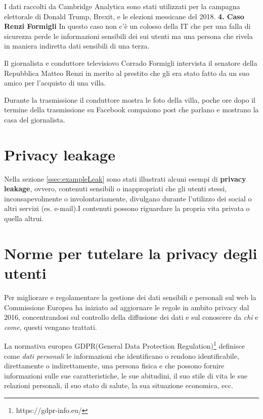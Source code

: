 I dati raccolti da Cambridge Analytica sono stati utilizzati per la campagna elettorale di Donald Trump, Brexit, e le elezioni messicane del 2018.\newline
\textbf{4. Caso Renzi Formigli}\cite{formigli}\newline
In questo caso non c'è un colosso della IT che per una falla di sicurezza perde le informazioni sensibili dei sui utenti ma una persona che rivela in maniera indiretta dati sensibili di una terza.

Il giornalista e conduttore televisiovo Corrado Formigli intervista il senatore della Repubblica Matteo Renzi in merito al prestito che gli era stato fatto da un suo amico per l’acquisto di una villa.


Durante la trasmissione il conduttore mostra le foto della villa, poche ore dopo il termine della trasmissione su Facebook compaiono post che parlano e mostrano la casa del giornalista.

\section{Privacy leakage}
\label{sec:privacyLeakage}
Nella sezione \ref{ssec:exampleLeak} sono stati illustrati alcuni esempi di \textbf{privacy leakage}, ovvero, contenuti sensibili o inappropriati che gli utenti stessi, inconsapevolmente o involontariamente, divulgano durante l'utilizzo dei social o altri servizi (es. e-mail).I contenuti possono riguardare la propria vita privata o quella altrui.

\section{Norme per tutelare la privacy degli utenti}
Per migliorare e regolamentare la gestione dei dati sensibili e personali sul web la Commissione Europea ha iniziato ad aggiornare le regole in ambito privacy dal 2016, concentrandosi sul controllo della diffusione dei dati e sul conoscere da \textit{chi} e \textit{come}, questi vengano trattati.

La normativa europea GDPR(General Data Protection Regulation)\footnote{https://gdpr-info.eu/} definisce come \textit{dati personali} le informazioni che identificano o rendono identificabile, direttamente o indirettamente, una persona fisica e che possono fornire informazioni sulle sue caratteristiche, le sue abitudini, il suo stile di vita le sue relazioni personali, il suo stato di salute, la sua situazione economica, ecc.

